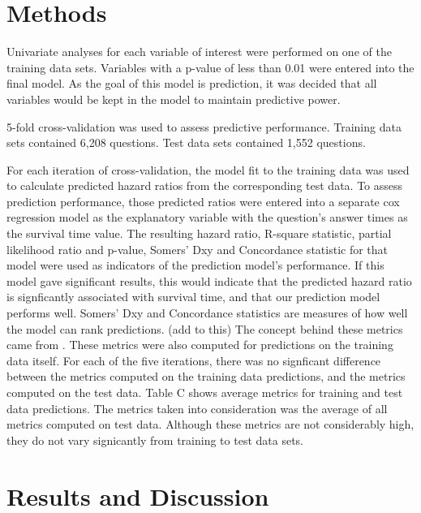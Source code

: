\documentclass[12pt]{article}
\begin{document}
\section{Methods} 

Univariate analyses for each variable of interest were performed on one of the training data sets. Variables with a p-value of less than 0.01 were entered into the final model. As the goal of this model is prediction, it was decided that all variables would be kept in the model to maintain predictive power. 

5-fold cross-validation was used to assess predictive performance. Training data sets contained 6,208 questions. Test data sets contained 1,552 questions. 

For each iteration of cross-validation, the model fit to the training data was used to calculate predicted hazard ratios from the corresponding test data. To assess prediction performance, those predicted ratios were entered into a separate cox regression model as the explanatory variable with the question's answer times as the survival time value. The resulting hazard ratio, R-square statistic, partial likelihood ratio and p-value, Somers' Dxy and Concordance statistic for that model were used as indicators of the prediction model's performance. If this model gave significant results, this would indicate that the predicted hazard ratio is signficantly associated with survival time, and that our prediction model performs well. Somers' Dxy and Concordance statistics are measures of how well the model can rank predictions. (add to this) The concept behind these metrics came from \cite{Chen}. These metrics were also computed for predictions on the training data itself. For each of the five iterations, there was no signficant difference between the metrics computed on the training data predictions, and the metrics computed on the test data. Table C shows average metrics for training and test data predictions. The metrics taken into consideration was the average of all metrics computed on test data. Although these metrics are not considerably high, they do not vary signicantly from training to test data sets.  

\section{Results and Discussion} 
\end{document}
